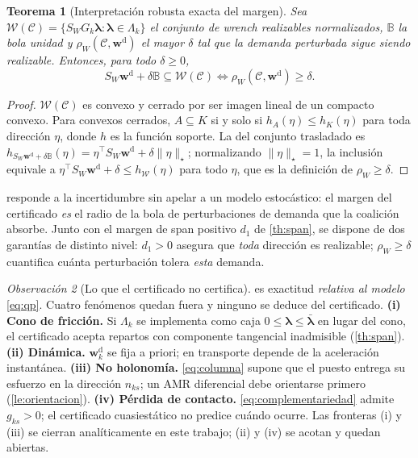 \documentclass[11pt,a4paper]{article}
\theoremstyle{plain}
\newtheorem{teorema}{Teorema}[section]
\theoremstyle{definition}
\theoremstyle{remark}
\newtheorem{observacion}[teorema]{Observación}
\newcommand{\Ccal}{\mathcal{C}}
\newcommand{\Wdem}{\bm{w}^{\mathrm{d}}}
\newcommand{\T}{^{\!\top}}
\begin{document}
\begin{teorema}[Interpretación robusta exacta del margen]
\label{th:robusto}
Sea $\mathcal W(\Ccal)=\{S_WG_k\bm\lambda:\bm\lambda\in\Lambda_k\}$ el conjunto
de \emph{wrench} realizables normalizados, $\mathbb B$ la bola unidad y
$\rho_W(\Ccal,\Wdem)$ el mayor $\delta$ tal que la demanda perturbada sigue
siendo realizable. Entonces, para todo $\delta\ge0$,
\[
  S_W\Wdem+\delta\mathbb B\subseteq\mathcal W(\Ccal)
  \iff
  \rho_W(\Ccal,\Wdem)\ge\delta .
\]
\end{teorema}

\begin{proof}
$\mathcal W(\Ccal)$ es convexo y cerrado por ser imagen lineal de un compacto
convexo. Para convexos cerrados, $A\subseteq K$ si y solo si
$h_A(\eta)\le h_K(\eta)$ para toda dirección $\eta$, donde $h$ es la función
soporte. La del conjunto trasladado es
$h_{S_W\Wdem+\delta\mathbb B}(\eta)=\eta\T S_W\Wdem+\delta\|\eta\|_\star$;
normalizando $\|\eta\|_\star=1$, la inclusión equivale a
$\eta\T S_W\Wdem+\delta\le h_{\mathcal W}(\eta)$ para todo $\eta$, que es la
definición de $\rho_W\ge\delta$.
\end{proof}

 responde a la incertidumbre sin apelar a un modelo
estocástico: el margen del certificado \emph{es} el radio de la bola de
perturbaciones de demanda que la coalición absorbe. Junto con el margen de span
positivo $d_1$ de \cref{th:span}, se dispone de dos garantías de distinto
nivel: $d_1>0$ asegura que \emph{toda} dirección es realizable; $\rho_W\ge\delta$
cuantifica cuánta perturbación tolera \emph{esta} demanda.

\begin{observacion}[Lo que el certificado no certifica]
\label{obs:fronteras}
 es exactitud \emph{relativa al modelo} \eqref{eq:qp}. Cuatro
fenómenos quedan fuera y ninguno se deduce del certificado.
\textbf{(i) Cono de fricción.} Si $\Lambda_k$ se implementa como caja
$0\le\bm\lambda\le\bar{\bm\lambda}$ en lugar del cono, el certificado acepta
repartos con componente tangencial inadmisible (\cref{th:span}).
\textbf{(ii) Dinámica.} $\Wdem_k$ se fija a priori; en transporte depende de la
aceleración instantánea.
\textbf{(iii) No holonomía.} \eqref{eq:columna} supone que el puesto entrega su
esfuerzo en la dirección $n_{ks}$; un AMR diferencial debe orientarse primero
(\cref{le:orientacion}).
\textbf{(iv) Pérdida de contacto.} \eqref{eq:complementariedad} admite
$g_{ks}>0$; el certificado cuasiestático no predice cuándo ocurre.
Las fronteras (i) y (iii) se cierran analíticamente en este trabajo; (ii) y (iv)
se acotan y quedan abiertas.
\end{observacion}
\end{document}
